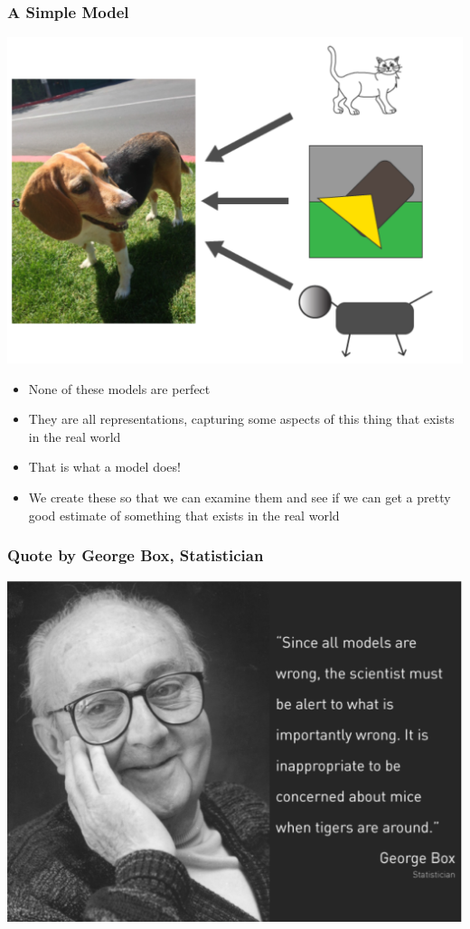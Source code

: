 \documentclass[12pt, block=fill]{beamer}
\begin{document}
\begin{frame}
  \frametitle{A Simple Model}
  \begin{center}
      \includegraphics[width=0.4\linewidth]{figures/model_c.png}   
  \end{center}
  \begin{itemize}
      \item None of these models are perfect
      \item They are all representations, capturing some aspects of this thing that exists in the real world
      \item That is what a model does!
      \item We create these so that we can examine them and see if we can get a pretty good estimate of something that exists in the real world
  \end{itemize}
\end{frame}

\begin{frame}
  \frametitle{Quote by George Box, Statistician}
  \begin{center}
    \includegraphics[width=0.9\linewidth]{figures/george_box_quote_a.png}     
  \end{center}
\end{frame}
\end{document}
